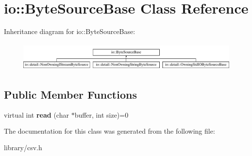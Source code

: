 \hypertarget{classio_1_1ByteSourceBase}{}\section{io\+:\+:Byte\+Source\+Base Class Reference}
\label{classio_1_1ByteSourceBase}
Inheritance diagram for io\+:\+:Byte\+Source\+Base\+:\begin{figure}[H]
\begin{center}
\leavevmode
\includegraphics[height=1.517615cm]{classio_1_1ByteSourceBase}
\end{center}
\end{figure}
\subsection*{Public Member Functions}
\begin{DoxyCompactItemize}
\item 
\mbox{\label{classio_1_1ByteSourceBase_a9598bcc869b79e44da07f0e6fa478615}} 
virtual int {\bfseries read} (char $\ast$buffer, int size)=0
\end{DoxyCompactItemize}


The documentation for this class was generated from the following file\+:\begin{DoxyCompactItemize}
\item 
library/csv.\+h\end{DoxyCompactItemize}
